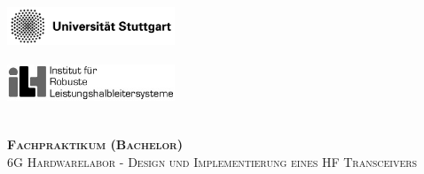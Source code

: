 \documentclass[a4paper, 11pt, oneside]{Thesis}  %
\begin{document}
\begin{titlepage}

\newcommand{\HRule}{\rule{\linewidth}{0.5mm}} %

\center %
\begin{minipage}{0.4\textwidth}
\begin{flushleft} \large
\includegraphics[width=5cm, height=1.2cm]{Pictures/UST.jpg}
\end{flushleft}
\end{minipage}

\begin{minipage}{0.4\textwidth}
\begin{flushright} \large
\includegraphics[width=5cm, height=1.2cm]{Pictures/ILH.jpg}
\end{flushright}
\end{minipage}\\[2cm]

\textsc{\LARGE \bfseries Fachpraktikum (Bachelor)}\\[0.2cm] %
\textsc{\LARGE 6G Hardwarelabor - Design und Implementierung eines HF Transceivers}\\[0.2cm] 



\end{titlepage}
\end{document}
